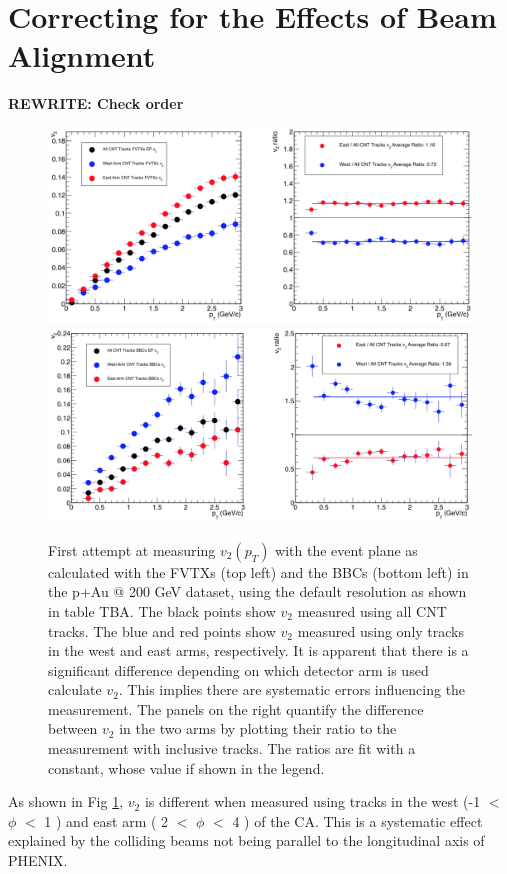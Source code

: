 \section{Correcting for the Effects of Beam Alignment}
\textbf{REWRITE: Check order}
\begin{figure}[!h]
\begin{center}
\includegraphics[width=0.85\linewidth]{figs/fvtxs_default_ew.png}
\includegraphics[width=0.85\linewidth]{figs/bbcs_default_ew.png}
\caption{First attempt at measuring $v_{2} (p_T)$ with the event plane as calculated with the FVTXs (top left) and the BBCs (bottom left) in the p+Au @ 200 GeV dataset, using the default resolution as shown in table TBA. The black points show $v_2$ measured using all CNT tracks. The blue and red points show $v_2$ measured using only tracks in the west and east arms, respectively. It is apparent that there is a significant difference depending on which detector arm is used calculate $v_2$. This implies there are systematic errors influencing the measurement. The panels on the right quantify the difference between $v_2$ in the two arms by plotting their ratio to the measurement with inclusive tracks. The ratios are fit with a constant, whose value if shown in the legend.}
\label{fig:fvtx_ew_default}
\end{center}
\end{figure}

As shown in Fig \ref{fig:fvtx_ew_default}, $v_2$ is different when measured using tracks in the west (-1 $<$ $\phi$ $<$ 1 ) and east arm ( 2 $<$ $\phi$ $<$ 4 ) of the CA. This is a systematic effect explained by the colliding beams not being parallel to the longitudinal axis of PHENIX. 

